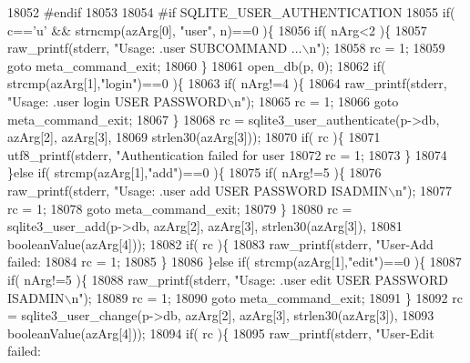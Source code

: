 \begin{DoxyCode}
{{{{{{{{{{{{{{{{{{{{{{{{{{{{{{{{{{{{{{{{{{{{{{{{{{{{{{{{{{{{{{{{{{{{{{{{{{{{{{{{{{{{{{{{{{{{{{{{{{{{{{{{{{{{{{{{{{{{{{{{{{{{{{{{{{{{{{{{{{{{{{{{{{{{{18052 \textcolor{preprocessor}{#endif}
18053 
18054 \textcolor{preprocessor}{#if SQLITE\_USER\_AUTHENTICATION}
18055   \textcolor{keywordflow}{if}( c==\textcolor{charliteral}{'u'} && strncmp(azArg[0], \textcolor{stringliteral}{"user"}, n)==0 )\{
18056     \textcolor{keywordflow}{if}( nArg<2 )\{
18057       raw_printf(stderr, \textcolor{stringliteral}{"Usage: .user SUBCOMMAND ...\(\backslash\)n"});
18058       rc = 1;
18059       \textcolor{keywordflow}{goto} meta\_command\_exit;
18060     \}
18061     open_db(p, 0);
18062     \textcolor{keywordflow}{if}( strcmp(azArg[1],\textcolor{stringliteral}{"login"})==0 )\{
18063       \textcolor{keywordflow}{if}( nArg!=4 )\{
18064         raw_printf(stderr, \textcolor{stringliteral}{"Usage: .user login USER PASSWORD\(\backslash\)n"});
18065         rc = 1;
18066         \textcolor{keywordflow}{goto} meta\_command\_exit;
18067       \}
18068       rc = sqlite3\_user\_authenticate(p->db, azArg[2], azArg[3],
18069                                      strlen30(azArg[3]));
18070       \textcolor{keywordflow}{if}( rc )\{
18071         utf8_printf(stderr, \textcolor{stringliteral}{"Authentication failed for user %
18072         rc = 1;
18073       \}
18074     \}\textcolor{keywordflow}{else} \textcolor{keywordflow}{if}( strcmp(azArg[1],\textcolor{stringliteral}{"add"})==0 )\{
18075       \textcolor{keywordflow}{if}( nArg!=5 )\{
18076         raw_printf(stderr, \textcolor{stringliteral}{"Usage: .user add USER PASSWORD ISADMIN\(\backslash\)n"});
18077         rc = 1;
18078         \textcolor{keywordflow}{goto} meta\_command\_exit;
18079       \}
18080       rc = sqlite3\_user\_add(p->db, azArg[2], azArg[3], strlen30(azArg[3]),
18081                             booleanValue(azArg[4]));
18082       \textcolor{keywordflow}{if}( rc )\{
18083         raw_printf(stderr, \textcolor{stringliteral}{"User-Add failed: %
18084         rc = 1;
18085       \}
18086     \}\textcolor{keywordflow}{else} \textcolor{keywordflow}{if}( strcmp(azArg[1],\textcolor{stringliteral}{"edit"})==0 )\{
18087       \textcolor{keywordflow}{if}( nArg!=5 )\{
18088         raw_printf(stderr, \textcolor{stringliteral}{"Usage: .user edit USER PASSWORD ISADMIN\(\backslash\)n"});
18089         rc = 1;
18090         \textcolor{keywordflow}{goto} meta\_command\_exit;
18091       \}
18092       rc = sqlite3\_user\_change(p->db, azArg[2], azArg[3], strlen30(azArg[3]),
18093                               booleanValue(azArg[4]));
18094       \textcolor{keywordflow}{if}( rc )\{
18095         raw_printf(stderr, \textcolor{stringliteral}{"User-Edit failed: %
}}}}}}}}}}}}}}}}}}}}}}}}}}}}}}}}}}}}}}}}}}}}}}}}}}}}}}}}}}}}}}}}}}}}}}}}}}}}}}}}}}}}}}}}}}}}}}}}}}}}}}}}}}}}}}}}}}}}}}}}}}}}}}}}}}}}}}}}}}}}}}}}}}}}}}}}
\end{DoxyCode}
